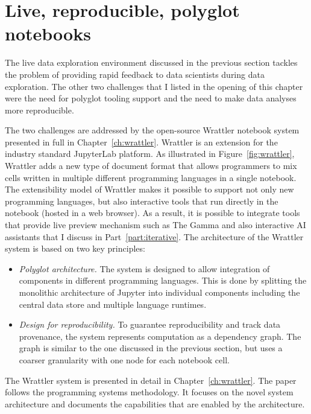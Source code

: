 \documentclass[fleqn,11pt]{report}
\theoremstyle{definition}
\newenvironment{nitemize}
{ \vspace{-0.4em}
  \begin{itemize}
    \setlength{\itemsep}{5pt}
    \setlength{\parskip}{0pt}
    \setlength{\parsep}{0pt} }
{ \end{itemize}
  \vspace{-0.4em} }
\begin{document}
\section{Live, reproducible, polyglot notebooks}

The live data exploration environment discussed in the previous section tackles the problem of
providing rapid feedback to data scientists during data exploration. The other two challenges that
I listed in the opening of this chapter were the need for polyglot tooling support and the need
to make data analyses more reproducible.

The two challenges are addressed by the open-source Wrattler notebook system presented in full in
Chapter~\ref{ch:wrattler}. Wrattler is an extension for the industry standard JupyterLab platform.
As illustrated in Figure~\ref{fig:wrattler}, Wrattler adds a new type of document format that
allows programmers to mix cells written in multiple different programming languages in a single
notebook. The extensibility model of Wrattler makes it possible to support not only new programming
languages, but also interactive tools that run directly in the notebook (hosted in a web browser).
As a result, it is possible to integrate tools that provide live preview mechanism such as
The Gamma and also interactive AI assistants that I discuss in Part~\ref{part:iterative}.
The architecture of the Wrattler system is based on two key principles:

\begin{nitemize}
\item \emph{Polyglot architecture.} The system is designed to allow integration of components in
  different programming languages. This is done by splitting the monolithic architecture of
  Jupyter into individual components including the central data store and multiple language runtimes.

\item \emph{Design for reproducibility.} To guarantee reproducibility and track data provenance,
  the system represents computation as a dependency graph. The graph is similar to the one discussed
  in the previous section, but uses a coarser granularity with one node for each notebook cell.
\end{nitemize}

The Wrattler system is presented in detail in Chapter~\ref{ch:wrattler}. The paper follows the
programming systems methodology. It focuses on the novel system architecture and documents the
capabilities that are enabled by the architecture.
\end{document}
